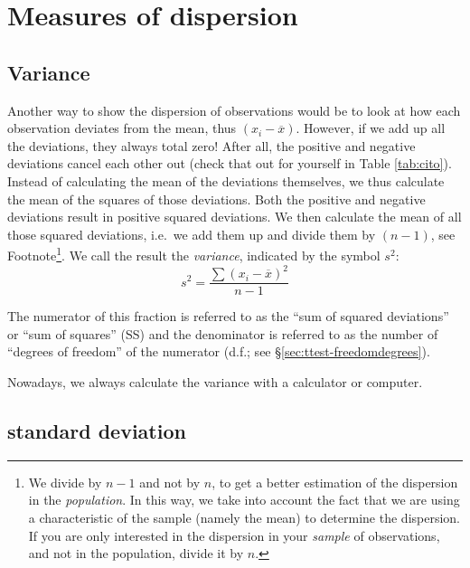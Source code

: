 \documentclass[
]{book}
\begin{document}
\hypertarget{sec:measures-of-dispersion}{%
\section{Measures of dispersion}\label{sec:measures-of-dispersion}}

\hypertarget{sec:variance}{%
\subsection{Variance}\label{sec:variance}}

Another way to show the dispersion of observations would be to look at how
each observation deviates from the mean, thus \((x_i-\overline{x})\). However, if we
add up all the deviations, they always total zero! After all, the positive and negative
deviations cancel each other out (check that out for yourself in
Table \ref{tab:cito}).
Instead of calculating the mean of the deviations themselves, we thus calculate the mean
of the squares of those deviations. Both the positive and negative deviations
result in positive squared deviations. We then calculate the mean of all
those squared deviations, i.e.~we add them up and divide them by
\((n-1)\), see Footnote\footnote{We divide by \(n-1\) and not by \(n\), to get a better estimation of the dispersion in the
  \emph{population}. In this way, we take into account the fact that we are using a characteristic of the
  sample (namely the mean) to determine the dispersion. If you are only interested in the
  dispersion in your \emph{sample} of observations, and not in the population, divide it by \(n\).}. We call the result the
\emph{variance}, indicated by the symbol \(s^2\):
\begin{equation}
  s^2 = \frac{ \sum (x_i - \overline{x})^2 } {n-1}
  \label{eq:variance}
\end{equation}

The numerator of
this fraction is referred to as the ``sum of squared deviations'' or
``sum of squares'' (SS) and the denominator is referred to as the number of
``degrees of freedom'' of the numerator (d.f.; see
§\ref{sec:ttest-freedomdegrees}).

Nowadays, we always calculate the variance with a calculator
or computer.

\hypertarget{sec:standarddeviation}{%
\subsection{standard deviation}\label{sec:standarddeviation}}
\end{document}
